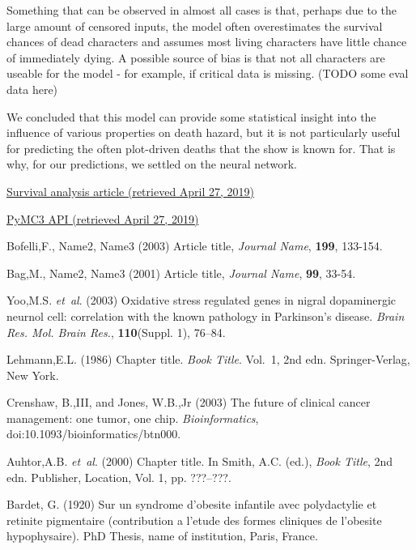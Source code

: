 \documentclass{bioinfo}
\begin{document}
Something that can be observed in almost all cases is that, perhaps due to the large amount of censored inputs, the model often overestimates the survival chances of dead characters and assumes most living characters have little chance of immediately dying. A possible source of bias is that not all characters are useable for the model - for example, if critical data is missing. (TODO some eval data here)

We concluded that this model can provide some statistical insight into the influence of various properties on death hazard, but it is not particularly useful for predicting the often plot-driven deaths that the show is known for. That is why, for our predictions, we settled on the neural network.




%
%
%
%
%
%
%
%
%


\begin{thebibliography}{}

  \href{https://docs.pymc.io/notebooks/survival_analysis.html}{Survival analysis article  (retrieved April 27, 2019)}

 \href{https://docs.pymc.io/api.html}{PyMC3 API (retrieved April 27, 2019)}

Bofelli,F., Name2, Name3 (2003) Article title, {\it Journal Name}, {\bf 199}, 133-154.

Bag,M., Name2, Name3 (2001) Article title, {\it Journal Name}, {\bf 99}, 33-54.

Yoo,M.S. \textit{et~al}. (2003) Oxidative stress regulated genes
in nigral dopaminergic neurnol cell: correlation with the known
pathology in Parkinson's disease. \textit{Brain Res. Mol. Brain
Res.}, \textbf{110}(Suppl. 1), 76--84.

Lehmann,E.L. (1986) Chapter title. \textit{Book Title}. Vol.~1, 2nd edn. Springer-Verlag, New York.

Crenshaw, B.,III, and Jones, W.B.,Jr (2003) The future of clinical
cancer management: one tumor, one chip. \textit{Bioinformatics},
doi:10.1093/bioinformatics/btn000.

Auhtor,A.B. \textit{et~al}. (2000) Chapter title. In Smith, A.C.
(ed.), \textit{Book Title}, 2nd edn. Publisher, Location, Vol. 1, pp.
???--???.

Bardet, G. (1920) Sur un syndrome d'obesite infantile avec
polydactylie et retinite pigmentaire (contribution a l'etude des
formes cliniques de l'obesite hypophysaire). PhD Thesis, name of
institution, Paris, France.

\end{thebibliography}
\end{document}
